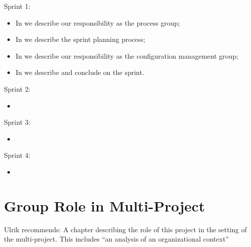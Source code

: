 \begin{documentorganization}
  \item Sprint 1:
  \begin{itemize}
    \item In  we describe our responsibility as the process group;
    \item In  we describe the sprint planning process;
    \item In  we describe our responsibility as the configuration management group;
    \item In  we describe and conclude on the sprint. 
  \end{itemize}
  \item Sprint 2:
  \begin{itemize}
    \item {}
  \end{itemize}
  \item Sprint 3:
  \begin{itemize}
    \item {}
  \end{itemize}
  \item Sprint 4:
  \begin{itemize}
    \item {}
  \end{itemize}
\end{documentorganization}

\section{Group Role in Multi-Project}
Ulrik recommends: A chapter describing the role of this project in the setting of the multi-project. This includes ``an analysis of an organizational context''